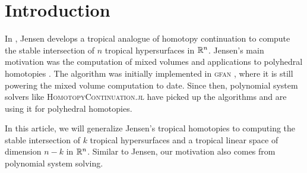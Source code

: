\section{Introduction}

In \cite{Jensen2016arXiv}, Jensen develops a tropical analogue of homotopy continuation to compute the stable intersection of $n$ tropical hypersurfaces in $\mathbb{R}^n$.  Jensen's main motivation was the computation of mixed volumes and applications to polyhedral homotopies \cite{HuberSturmfels1995}.  The algorithm was initially implemented in \textsc{gfan} \cite{gfan,Jensen2016ICMS}, where it is still powering the mixed volume computation to date.  Since then, polynomial system solvers like \textsc{HomotopyContinuation.jl} \cite{HomotopyContinuation.jl} have picked up the algorithms and are using it for polyhedral homotopies.

In this article, we will generalize Jensen's tropical homotopies to computing the stable intersection of $k$ tropical hypersurfaces and a tropical linear space of dimension $n-k$ in $\mathbb{R}^n$.  Similar to Jensen, our motivation also comes from polynomial system solving.

